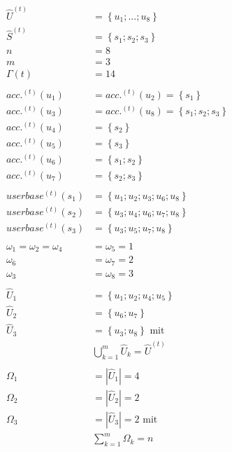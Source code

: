 \begin{parcolumns}[rulebetween=true]{2}
{\begin{align*}
\widehat{U}^{(t)} &= \left\{ u_1;...; u_8 \right\} \\
\widehat{S}^{(t)} &= \left\{ s_1; s_2; s_3 \right\} \\
n &= 8 \\
m &= 3 \\
\Gamma(t) &= 14 \\
\textrm{ } \\
acc.^{(t)}(u_1) &= acc.^{(t)}(u_2) = \left\{ s_1 \right\} \\
acc.^{(t)}(u_3) &= acc.^{(t)}(u_8) = \left\{ s_1; s_2; s_3 \right\} \\
acc.^{(t)}(u_4) &= \left\{ s_2 \right\} \\
acc.^{(t)}(u_5) &= \left\{ s_3 \right\} \\
acc.^{(t)}(u_6) &= \left\{ s_1; s_2 \right\} \\
acc.^{(t)}(u_7) &= \left\{ s_2; s_3 \right\} \\
\textrm{ } \\
userbase^{(t)}(s_1) &= \left\{ u_1; u_2; u_3; u_6; u_8 \right\} \\
userbase^{(t)}(s_2) &= \left\{ u_3; u_4; u_6; u_7; u_8 \right\} \\
userbase^{(t)}(s_3) &= \left\{ u_3; u_5; u_7; u_8 \right\} \\
\textrm{ } \\
\omega_1 = \omega_2 = \omega_4 &= \omega_5 = 1 \\
\omega_6 &= \omega_7 = 2 \\
\omega_3 &= \omega_8 = 3 \\
\textrm{ } \\
\widehat{U}_1 &= \left\{ u_1; u_2; u_4; u_5 \right\} \\
\widehat{U}_2 &= \left\{ u_6; u_7 \right\} \\
\widehat{U}_3 &= \left\{ u_3; u_8 \right\} \textrm{  mit } \\
& \bigcup_{k=1}^{m} \widehat{U}_k = \widehat{U}^{(t)} \\
\textrm{ } \\
\Omega_1 &= \left| \widehat{U}_1 \right| = 4 \\
\Omega_2 &= \left| \widehat{U}_2 \right| = 2 \\
\Omega_3 &= \left| \widehat{U}_3 \right| = 2 \textrm{  mit } \\
& \sum_{k=1}^{m} \Omega_k = n \\
\textrm{ }
\end{align*}



}
\end{parcolumns}

